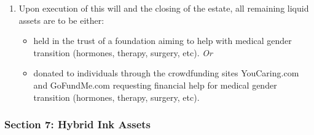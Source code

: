 \begin{enumerate}
\def\labelenumi{\arabic{enumi}.}
\tightlist
\item
  Upon execution of this will and the closing of the estate, all remaining liquid assets are to be either:

  \begin{itemize}
  \tightlist
  \item
    held in the trust of a foundation aiming to help with medical gender transition (hormones, therapy, surgery, etc). \emph{Or}
  \item
    donated to individuals through the crowdfunding sites YouCaring.com and GoFundMe.com requesting financial help for medical gender transition (hormones, therapy, surgery, etc).
  \end{itemize}
\end{enumerate}

\subsubsection*{Section 7: Hybrid Ink Assets}\label{section-7-hybrid-ink-assets}

